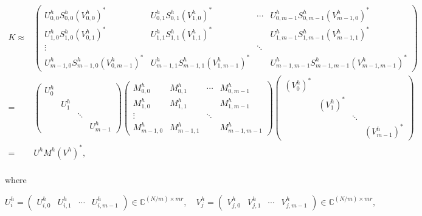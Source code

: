 \begin{equation}\label{eq:KeqUMV}
  \begin{split}
    K \approx &
    \begin{pmatrix}
      U^h_{0,0}S^h_{0,0}(V^h_{0,0})^* & U^h_{0,1}S^h_{0,1}(V^h_{1,0})^* &
      \cdots & U^h_{0,m-1}S^h_{0,m-1}(V^h_{m-1,0})^*\\
      U^h_{1,0}S^h_{1,0}(V^h_{0,1})^* & U^h_{1,1}S^h_{1,1}(V^h_{1,1})^* &
              & U^h_{1,m-1}S^h_{1,m-1}(V^h_{m-1,1})^*\\
      \vdots & & \ddots & \\
      U^h_{m-1,0}S^h_{m-1,0}(V^h_{0,m-1})^* & U^h_{m-1,1}S^h_{m-1,1}(V^h_{1,m-1})^* &
              & U^h_{m-1,m-1}S^h_{m-1,m-1}(V^h_{m-1,m-1})^*
    \end{pmatrix}\\
    = &
    \begin{pmatrix}
      U^h_{0} & & &\\
      & U^h_{1} & &\\
      & & \ddots &\\
      & & & U^h_{m-1}
    \end{pmatrix}
    \begin{pmatrix}
      M^h_{0,0} & M^h_{0,1} & \cdots & M^h_{0,m-1}\\
      M^h_{1,0} & M^h_{1,1} & & M^h_{1,m-1}\\
      \vdots & & \ddots & \\
      M^h_{m-1,0} & M^h_{m-1,1} & & M^h_{m-1,m-1}
    \end{pmatrix}
    \begin{pmatrix}
      (V_{0}^h)^* & & &\\
      & (V_{1}^h)^* & &\\
      & & \ddots &\\
      & & & (V_{m-1}^h)^*
    \end{pmatrix}\\
    = & U^h M^h (V^h)^*,\\
  \end{split}
\end{equation}

where

\begin{equation}
  U_{i}^h=
  \begin{pmatrix}
    U^h_{i,0} & U^h_{i,1} & \cdots & U^h_{i,m-1}
  \end{pmatrix}
  \in \mathbb{C}^{(N/m) \times m r},
  \quad
  V^h_{j}=
  \begin{pmatrix}
    V^h_{j,0} & V^h_{j,1} & \cdots & V^h_{j,m-1}
  \end{pmatrix}
  \in \mathbb{C}^{(N/m) \times m r},
  \label{eq:expression-UV}
\end{equation}

